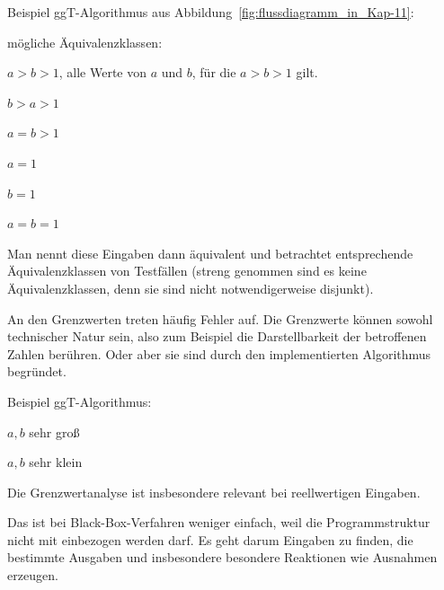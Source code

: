 \vspace{1mm} %

Beispiel ggT-Algorithmus aus Abbildung~\ref{fig:flussdiagramm_in_Kap-11}: %

\vspace{1mm} %

mögliche Äquivalenzklassen:

\begin{addmargin}[25pt]{25pt}
	$a>b>1$, \dasHeisst alle Werte von $a$ und $b$, für die $a>b>1$ gilt.
	
	$b>a>1$
	
	$a=b>1$
	
	$a=1$
	
	$b=1$
	
	$a=b=1$
\end{addmargin}

Man nennt diese Eingaben dann äquivalent und betrachtet entsprechende Äqui\-valenz\-klassen von Testfällen (streng genommen sind es keine Äquivalenzklassen, denn sie sind nicht notwendigerweise disjunkt).

\vspace{2mm} %


An den Grenzwerten treten häufig Fehler auf. Die Grenzwerte können sowohl technischer Natur sein, also zum Beispiel die Darstellbarkeit der betroffenen Zahlen berühren. Oder aber sie sind durch den implementierten Algorithmus begründet.

\vspace{1mm} %

Beispiel ggT-Algorithmus:

\begin{addmargin}[25pt]{25pt}
	$a, b$ sehr groß
	
	$a,b$ sehr klein
\end{addmargin}

Die Grenzwertanalyse ist insbesondere relevant bei reellwertigen Eingaben.

\vspace{2mm} %


Das ist bei Black-Box-Verfahren weniger einfach, weil die Programmstruktur nicht mit einbezogen werden darf. Es geht darum Eingaben zu finden, die bestimmte Ausgaben und insbesondere besondere Reaktionen wie Ausnahmen erzeugen.

